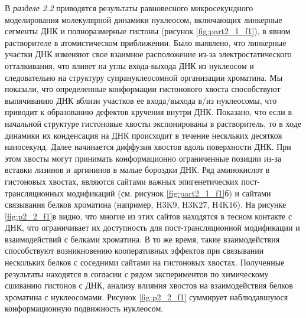 В \textit{разделе 2.2} приводятся результаты равновесного микросекундного моделирования молекулярной динамики нуклеосом, включающих линкерные сегменты ДНК и полноразмерные гистоны (рисунок \ref{fig:part2_1_f1}), в явном растворителе в атомистическом приближении.
Было выявлено, что линкерные участки ДНК изменяют свое взаимное расположение из-за электростатического отталкивания, что влияет на углы входа-выхода ДНК из нуклеосом и следовательно на структуру супрануклеосомной организации хроматина. Мы показали, что определенные конформации гистонового хвоста способствуют выпячиванию ДНК вблизи участков ее входа/выхода в/из нуклеосомы, что приводит к образованию дефектов кручения внутри ДНК. Показано, что если в начальной структуре гистоновые хвосты экспонированы в растворитель, то в ходе динамики их конденсация на ДНК происходит в течение нескльких десятков наносекунд. Далее начинается диффузия хвостов вдоль поверхности ДНК. При этом хвосты могут принимать конформационно ограниченные позиции из-за вставки  лизинов и аргининов в малые бороздки ДНК. Ряд аминокислот в гистоновых хвостах, являются сайтами важных эпигенетических пост-трансляционных модификаций (см. рисунок \ref{fig:part2_1_f1}б) и сайтами связывания белков хроматина (например, H3K9, H3K27, H4K16). На рисунке \ref{fig:p2_2_f1}в видно, что многие из этих сайтов находятся в тесном контакте с ДНК, что ограничивает их доступность для пост-трансляционной модификации и взаимодействий с белками хроматина. В то же время, такие взаимодействия способствуют возникновению кооперативных эффектов при связывании нескольких белков с соседними сайтами на гистоновых хвостах. Полученные результаты находятся в согласии  с рядом экспериментов по химическому сшиванию гистонов с ДНК, анализу влияния хвостов на взаимодействия белков хроматина с нуклеосомами.  Рисунок \ref{fig:p2_2_f1} суммирует наблюдавшуюся конформационную подвижность нуклеосом.


